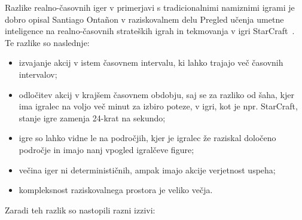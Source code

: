 \documentclass[a4paper, 12pt]{book}
\begin{document}
Razlike realno-časovnih iger v primerjavi s tradicionalnimi namiznimi igrami je dobro opisal Santiago Ontañon v raziskovalnem delu Pregled učenja umetne inteligence na realno-časovnih strateških igrah in tekmovanja v igri StarCraft~\cite{survey_real_time_strategy_ai_research_starcraft}.
Te razlike so naslednje:
\begin{itemize}
	\item izvajanje akcij v istem časovnem intervalu, ki lahko trajajo več časovnih intervalov;
	\item odločitev akcij v krajšem časovnem obdobju, saj se za razliko od šaha, kjer ima igralec na voljo več minut za izbiro poteze, v igri, kot je npr. StarCraft, stanje igre zamenja 24-krat na sekundo;
	\item igre so lahko vidne le na področjih, kjer je igralec že raziskal določeno področje in imajo nanj vpogled igralčeve figure;
	\item večina iger ni determinističnih, ampak imajo akcije verjetnost uspeha;
	\item kompleksnost raziskovalnega prostora je veliko večja.
\end{itemize}
\noindent
Zaradi teh razlik so nastopili razni izzivi:
\end{document}

